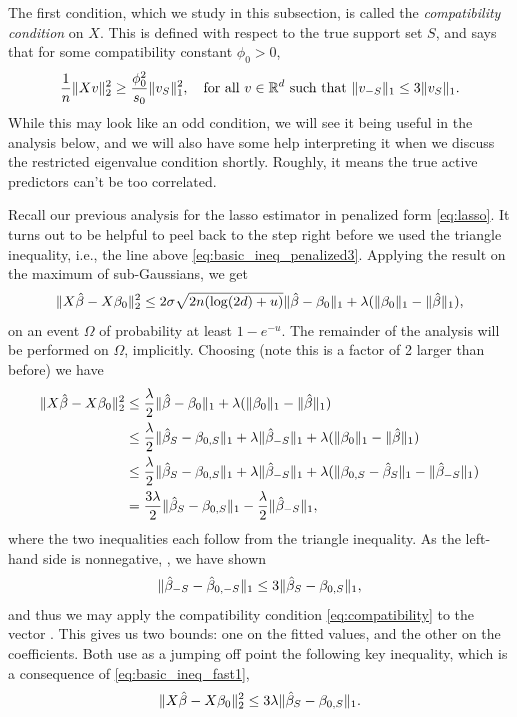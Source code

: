 \documentclass{article}
\begin{document}
The first condition, which we study in this subsection, is called the
\emph{compatibility condition} on $X$. This is defined with respect to the true
support set $S$, and says that for some compatibility constant $\phi_0>0$,   
\begin{equation}
\label{eq:compatibility}
\frac{1}{n}\|Xv\|_2^2 \geq \frac{\phi_0^2}{s_0} \|v_{S}\|_1^2, \quad  
\text{for all $v \in \mathbb{R}^d$ such that $\|v_{-S}\|_1 \leq 3 \|v_{S}\|_1$}.  
\end{equation}
While this may look like an odd condition, we will see it being useful in the
analysis below, and we will also have some help interpreting it when we discuss
the restricted eigenvalue condition shortly. Roughly, it means the true active
predictors can't be too correlated.  

Recall our previous analysis for the lasso estimator in penalized form
\eqref{eq:lasso}. It turns out to be helpful to peel back to the step right
before we used the triangle inequality, i.e., the line above
\eqref{eq:basic_ineq_penalized3}. Applying the result on the maximum of    
sub-Gaussians, we get 
\[
\|X\hat{\beta} - X\beta_0\|_2^2 \leq 2 \sigma \sqrt{2n (\log(2d) + u)} 
\|\hat{\beta} - \beta_0\|_1 + \lambda (\|\beta_0\|_1 - \|\hat{\beta}\|_1),
\]
on an event $\Omega$ of probability at least $1-e^{-u}$. The remainder of the
analysis will be performed on $\Omega$, implicitly. Choosing  (note this is a factor of 2 larger
than before) we have  
\begin{align}
\nonumber
\|X\hat{\beta} - X\beta_0\|_2^2 
&\leq \frac{\lambda}{2} \|\hat{\beta} - \beta_0\|_1 + 
  \lambda( \|\beta_0\|_1 - \|\hat{\beta}\|_1) \\ 
\nonumber
&\leq \frac{\lambda}{2} \|\hat{\beta}_S - \beta_{0,S}\|_1 + \lambda \|\hat{\beta}_{-S}\|_1
  + \lambda( \|\beta_0\|_1 - \|\hat{\beta}\|_1) \\
\nonumber
&\leq \frac{\lambda}{2} \|\hat{\beta}_S - \beta_{0,S}\|_1 + \lambda \|\hat{\beta}_{-S}\|_1
  + \lambda( \|\beta_{0,S}-\hat{\beta}_S\|_1 - \|\hat{\beta}_{-S}\|_1) \\ 
\label{eq:basic_ineq_fast1}
&= \frac{3\lambda}{2} \|\hat{\beta}_S - \beta_{0,S}\|_1 - 
  \frac{\lambda}{2} \|\hat{\beta}_{-S}\|_1,  
\end{align}
where the two inequalities each follow from the triangle inequality. As the
left-hand side is nonnegative, , we
have shown  
\[
\|\hat{\beta}_{-S} - \hat{\beta}_{0,-S} \|_1 \leq 3 \|\hat{\beta}_S - \beta_{0,S}\|_1,  
\]
and thus we may apply the compatibility condition \eqref{eq:compatibility} to
the vector . This gives us two bounds: one on the
fitted values, and the other on the coefficients. Both use as a jumping off
point the following key inequality, which is a consequence of
\eqref{eq:basic_ineq_fast1},  
\begin{equation}
\label{eq:basic_ineq_fast2}
\|X\hat{\beta} - X\beta_0\|_2^2 \leq 3\lambda \|\hat{\beta}_S - \beta_{0,S}\|_1.   
\end{equation}
\end{document}
